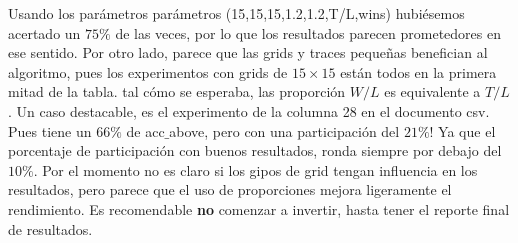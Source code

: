 \documentclass[11pt]{article}
\begin{document}
Usando los parámetros parámetros (15,15,15,1.2,1.2,T/L,wins) hubiésemos acertado un $75\%$ de las veces, por lo que los resultados parecen prometedores en ese sentido. Por otro lado, parece que las grids y traces pequeñas benefician al algoritmo, pues los experimentos con grids de $15\times 15$ están todos en la primera mitad de la tabla. tal cómo se esperaba, las proporción $W/L$  es equivalente a $T/L$. Un caso destacable, es el experimento de la columna 28 en el documento csv. Pues tiene un $66\%$ de acc$\_$above, pero con una participación del $21\%$! Ya que el porcentaje de participación con buenos resultados, ronda siempre por debajo del $10\%$.  Por el momento no es claro si los gipos de grid tengan influencia en los resultados, pero parece que el uso de proporciones mejora ligeramente el rendimiento. Es recomendable \textbf{no} comenzar a invertir,  hasta tener el reporte final de resultados.
\end{document}
